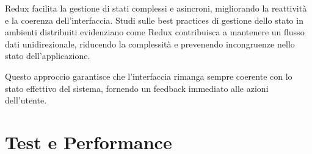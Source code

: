Redux facilita la gestione di stati complessi e asincroni, migliorando la reattività e la coerenza dell'interfaccia. Studi sulle best practices di gestione dello stato in ambienti distribuiti evidenziano come Redux contribuisca a mantenere un flusso dati unidirezionale, riducendo la complessità e prevenendo incongruenze nello stato dell'applicazione. \cite{zhao2024}

Questo approccio garantisce che l'interfaccia rimanga sempre coerente con lo stato effettivo del sistema, fornendo un feedback immediato alle azioni dell'utente.

\section{Test e Performance}
\noindent

